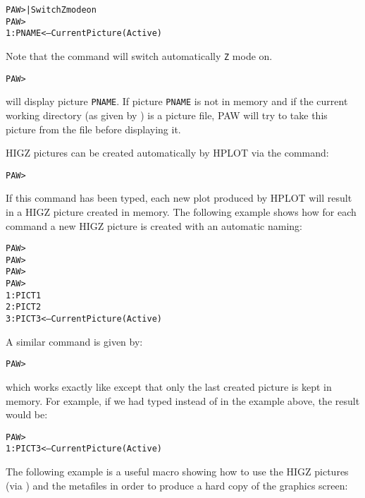 \begin{alltt}
PAW >                      | Switch Z mode on
PAW > 
 1: PNAME <-- Current Picture (Active)
\end{alltt}

Note that the command  will switch automatically
\texttt{Z} mode on.

\begin{alltt}
PAW > 
\end{alltt}

will display picture \texttt{PNAME}. 
If picture \texttt{PNAME} is not in memory and if
the current working directory (as given by ) is a picture file, 
PAW will try to take this picture from the file before displaying it.

HIGZ pictures can be created automatically by HPLOT via the command:

\begin{alltt}
PAW > 
\end{alltt}

If this command has been typed, each new plot produced by HPLOT will result in a
HIGZ picture created in memory. 
The following example shows how for each
 command a new HIGZ picture 
is created with an automatic naming:

\begin{alltt}
PAW > 
PAW > 
PAW > 
PAW > 
 1: PICT1
 2: PICT2
 3: PICT3 <-- Current Picture (Active)
\end{alltt}

A similar command is given by:

\begin{alltt}
PAW > 
\end{alltt}

which works exactly like  
except that only the last created picture is kept in memory. 
For example, if we had typed 
instead of  in the example above, 
the result would be:

\begin{alltt}
PAW > 
 1: PICT3 <-- Current Picture (Active)
\end{alltt}

The following example is a useful macro showing how to use the HIGZ pictures
(via ) and the metafiles in order 
to produce a hard copy of the graphics screen:
\label{sec:POSTmacro}

